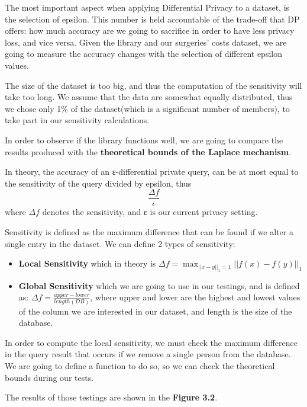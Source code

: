 The most important aspect when applying Differential Privacy to a dataset, is the selection of epsilon. This number is held accountable of the trade-off that DP offers: how much accuracy are we going to sacrifice in order to have less privacy loss, and vice versa. Given the library and our surgeries' costs dataset, we are going to measure the accuracy changes with the selection of different epsilon values.

The size of the dataset is too big, and thus the computation of the sensitivity will take too long. We assume that the data are somewhat equally distributed, thus we chose only 1\% of the dataset(which is a significant number of members), to take part in our sensitivity calculations.

In order to observe if the library functions well, we are going to compare the results produced with the \textbf{theoretical bounds of the Laplace mechanism}. 

In theory, the accuracy of an ε-differential private query, can be at most equal to the sensitivity of the query divided by epsilon, thus $$\frac{\Delta f}{\epsilon}$$ where $\Delta f$ denotes the sensitivity, and ε is our current privacy setting. 

Sensitivity is defined as the maximum difference that can be found if we alter a single entry in the dataset. We can define 2 types of sensitivity:

\begin{itemize}
    \item \textbf{Local Sensitivity} which in theory is $ \Delta f = \max_{||x-y||_1 = 1} ||f(x)-f(y)||_1$
    \item \textbf{Global Sensitivity} which we are going to use in our testings, and is defined as: $ \Delta f = \frac{upper - lower}{length(DB)} $, where upper and lower are the highest and lowest values of the column we are interested in our dataset, and length is the size of the database.
\end{itemize}

In order to compute the local sensitivity, we must check the maximum difference in the query result that occurs if we remove a single person from the database. We are going to define a function to do so, so we can check the theoretical bounds during our tests.

The results of those testings are shown in the \textbf{Figure 3.2}.

